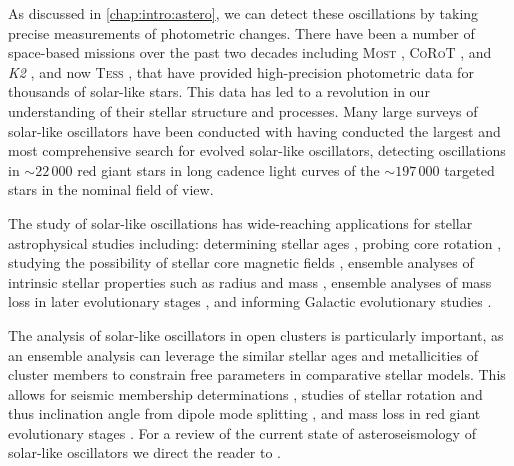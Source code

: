 As discussed in \cref{chap:intro:astero}, we can detect these oscillations by taking precise measurements of photometric changes. There have been a number of space-based missions over the past two decades including \textsc{Most} \citep{rucinski_most_2003}, \textsc{CoRoT} \citep{michel_corot_1998}, \Kepler{} and \textit{K2} \citep{borucki_kepler_2009}, and now \textsc{Tess} \citep{ricker_transiting_2014}, that have provided high-precision photometric data for thousands of solar-like stars. This data has led to a revolution in our understanding of their stellar structure and processes. Many large surveys of solar-like oscillators have been conducted \cite[eg.][]{stello_detection_2010,hekker_characterization_2011,mosser_characterization_2012,mosser_mixed_2014,yu_asteroseismology_2018-1} with \cite{hon_search_2019} having conducted the largest and most comprehensive search for evolved solar-like oscillators, detecting oscillations in $\sim22\,000$ red giant stars in long cadence light curves of the $\sim197\,000$ targeted stars in the \Kepler{} nominal field of view.

The study of solar-like oscillations has wide-reaching applications for stellar astrophysical studies including: determining stellar ages \citep{silva_aguirre_ages_2015, bellinger_seismic_2020}, probing core rotation \citep{beck_kepler_2011, mosser_probing_2012, deheuvels_seismic_2014}, studying the possibility of stellar core magnetic fields \citep{fuller_asteroseismology_2015, stello_suppression_2016, stello_prevalence_2016, loi_torsional_2017, loi_low-degree_2020}, ensemble analyses of intrinsic stellar properties such as radius and mass \cite[eg.][]{garcia_asteroseismology_2018, hekker_giant_2017}, ensemble analyses of mass loss in later evolutionary stages \citep{miglio_asteroseismology_2012}, and informing Galactic evolutionary studies \citep{casagrande_photometric_2015, sharma_stellar_2016, silva_aguirre_confirming_2018}.

The analysis of solar-like oscillators in open clusters is particularly important, as an ensemble analysis can leverage the similar stellar ages and metallicities of cluster members to constrain free parameters in comparative stellar models. This allows for seismic membership determinations \citep{stello_detection_2010,stello_asteroseismic_2011,bellamy_using_2015}, studies of stellar rotation and thus inclination angle from dipole mode splitting \citep{corsaro_spin_2017}, and mass loss in red giant evolutionary stages \citep{miglio_asteroseismology_2012}. For a review of the current state of asteroseismology of solar-like oscillators we direct the reader to \cite{chaplin_asteroseismology_2013}.


